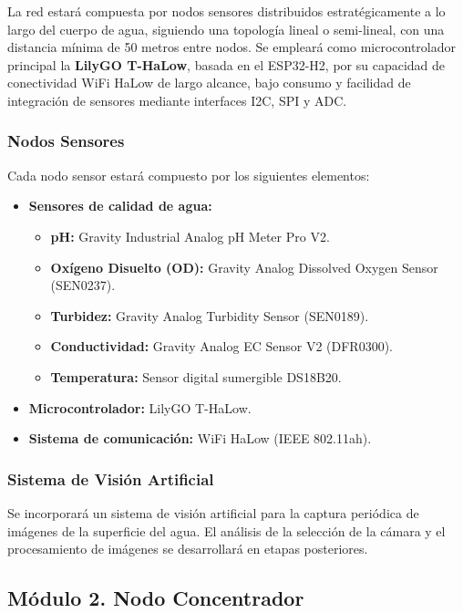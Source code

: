 La red estar\'a compuesta por nodos sensores distribuidos estrat\'egicamente a lo largo del cuerpo de agua, siguiendo una topolog\'ia lineal o semi-lineal, con una distancia m\'inima de 50 metros entre nodos. Se emplear\'a como microcontrolador principal la \textbf{LilyGO T-HaLow}, basada en el ESP32-H2, por su capacidad de conectividad WiFi HaLow de largo alcance, bajo consumo y facilidad de integraci\'on de sensores mediante interfaces I2C, SPI y ADC.

\subsubsection{Nodos Sensores}

Cada nodo sensor estar\'a compuesto por los siguientes elementos:
\begin{itemize}
    \item \textbf{Sensores de calidad de agua:}
    \begin{itemize}
        \item \textbf{pH:} Gravity Industrial Analog pH Meter Pro V2.
        \item \textbf{Ox\'igeno Disuelto (OD):} Gravity Analog Dissolved Oxygen Sensor (SEN0237).
        \item \textbf{Turbidez:} Gravity Analog Turbidity Sensor (SEN0189).
        \item \textbf{Conductividad:} Gravity Analog EC Sensor V2 (DFR0300).
        \item \textbf{Temperatura:} Sensor digital sumergible DS18B20.
    \end{itemize}
    \item \textbf{Microcontrolador:} LilyGO T-HaLow.
    \item \textbf{Sistema de comunicaci\'on:} WiFi HaLow (IEEE 802.11ah).
\end{itemize}

\subsubsection{Sistema de Visi\'on Artificial}

Se incorporar\'a un sistema de visi\'on artificial para la captura peri\'odica de im\'agenes de la superficie del agua. El an\'alisis de la selecci\'on de la c\'amara y el procesamiento de im\'agenes se desarrollar\'a en etapas posteriores.

\subsection{M\'odulo 2. Nodo Concentrador}

